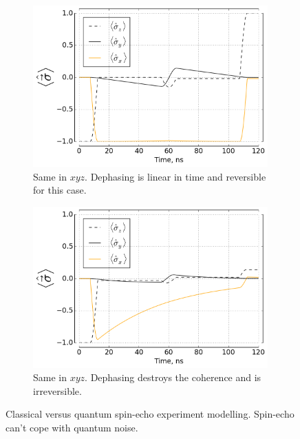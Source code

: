 \documentclass[12pt]{report}
\numberwithin{equation}{section}
\begin{document}
\begin{figure}
\begin{subfigure}[t]{0.45\textwidth}
\centering
\includegraphics[width=0.99\textwidth]{cse_xyz_rf}
\caption{Same in $xyz$. Dephasing is linear in time and reversible for this case.}
\end{subfigure}
\begin{subfigure}[t]{0.45\textwidth}
\centering
\includegraphics[width=0.99\textwidth]{qse_xyz_rf}
\caption{Same in $xyz$. Dephasing destroys the coherence and is irreversible.}
\end{subfigure}
\caption{Classical versus quantum spin-echo experiment modelling. Spin-echo can't cope with quantum noise.}
\label{fig:se}
\endgroup

\end{figure}



\end{document}
